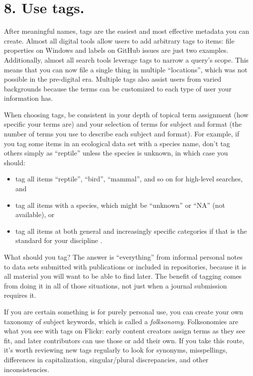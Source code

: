 \documentclass[10pt,letterpaper]{article}
\newcommand{\rulemajor}[1]{\section*{#1}}
\begin{document}
\rulemajor{8. Use tags.}

After meaningful names, tags are the easiest and most effective metadata you can
create. Almost all digital tools allow users to add arbitrary tags to items:
file properties on Windows and labels on GitHub issues are just two examples.
Additionally, almost all search tools leverage tags to narrow a query's scope.
This means that you can now file a single thing in multiple ``locations'', which
was not possible in the pre-digital era. Multiple tags also assist users from
varied backgrounds because the terms can be customized to each type of user your
information has.

When choosing tags, be consistent in your depth of topical term assignment (how
specific your terms are) and your selection of terms for subject and format (the
number of terms you use to describe each subject and format). For example, if
you tag some items in an ecological data set with a species name, don't tag
others simply as ``reptile'' unless the species is unknown, in which case you
should:

\begin{itemize}

\item
  tag all items ``reptile'', ``bird'', ``mammal'', and so on for high-level
  searches, and

\item
  tag all items with a species, which might be ``unknown'' or ``NA'' (not
  available), or
  
\item
  tag all items at both general and increasingly specific categories if that is
  the standard for your discipline \cite{FAIR2020}.

\end{itemize}

What should you tag?  The answer is ``everything'' from informal personal notes
to data sets submitted with publications or included in repositories, because it
is all material you will want to be able to find later. The benefit of tagging
comes from doing it in all of those situations, not just when a journal
submission requires it.

If you are certain something is for purely personal use, you can create your own
taxonomy of subject keywords, which is called a \emph{folksonomy}. Folksonomies
are what you see with tags on Flickr: early content creators assign terms as
they see fit, and later contributors can use those or add their own. If you
take this route, it's worth reviewing new tags regularly to look for synonyms,
misspellings, differences in capitalization, singular/plural discrepancies, and
other inconsistencies.
\end{document}
